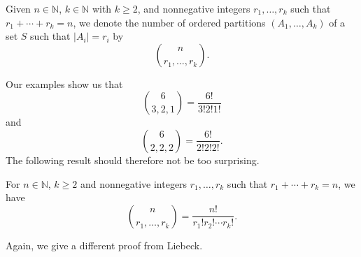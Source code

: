 \documentclass[11pt,dvipsnames]{book}
\numberwithin{equation}{section} %
\numberwithin{figure}{section} %
\numberwithin{table}{section} %
\begin{document}
\begin{definition}
Given $n \in \mathbb{N}$, $k \in \mathbb{N}$ with $k \geq 2$, and nonnegative integers $r_{1}, \dots ,r_{k}$ such that $r_{1}+\cdots + r_{k}=n$, we denote the number of ordered partitions $(A_{1}, \dots ,A_{k})$ of a set $S$ such that $|A_{i}|=r_{i}$ by
\[
{n \choose r_{1}, \dots , r_{k}}.
\]
\end{definition}

Our examples show us that 
\[
{6 \choose 3, 2, 1} = \frac{6!}{3!2!1!}
\]
and 
\[
{6 \choose 2,2,2} = \frac{6!}{2!2!2!}.
\]
The following result should therefore not be too surprising.
\begin{theorem}
\label{t:mutlinomial}
For $n \in \mathbb{N}$, $k \geq 2$ and nonnegative integers $r_{1}, \dots ,r_{k}$ such that $r_{1}+\cdots + r_{k}=n$, we have
\[
{n \choose r_{1}, \dots , r_{k}} = \frac{n!}{r_{1}!r_{2}!\cdots r_{k}!}.
\]
\end{theorem}

Again, we give a different proof from Liebeck.
\end{document}
